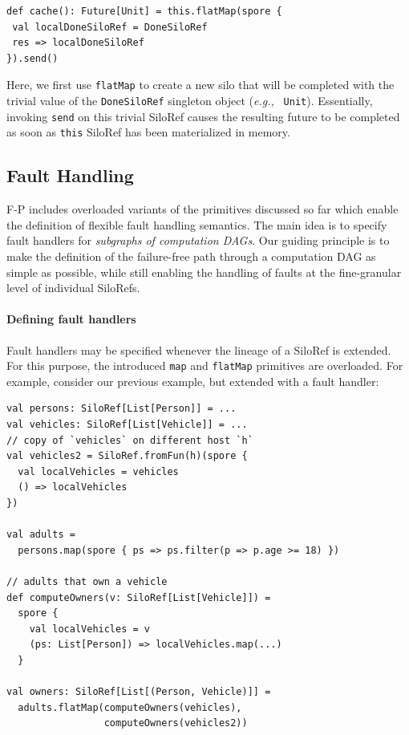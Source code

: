 \documentclass[preprint]{sigplanconf}
\theoremstyle{definition}
\theoremstyle{definition}
\newcommand{\eg}{{\em e.g.,~}}
\begin{document}
\begin{lstlisting}
def cache(): Future[Unit] = this.flatMap(spore {
 val localDoneSiloRef = DoneSiloRef
 res => localDoneSiloRef
}).send()

\end{lstlisting}
\noindent
Here, we first use \verb|flatMap| to create a new silo that will be completed
with the trivial value of the \verb|DoneSiloRef| singleton object (\eg
\verb|Unit|). Essentially, invoking \verb|send| on this trivial SiloRef causes
the resulting future to be completed as soon as \verb|this| SiloRef has been
materialized in memory.






\subsection{Fault Handling}
\label{sec:fault-handling}

F-P includes overloaded variants of the primitives discussed so far which
enable the definition of flexible fault handling semantics. The main idea is
to specify fault handlers for \emph{subgraphs of computation DAGs}. Our
guiding principle is to make the definition of the failure-free path through a
computation DAG as simple as possible, while still enabling the handling of
faults at the fine-granular level of individual SiloRefs.

\paragraph{Defining fault handlers} Fault handlers may be specified whenever
the lineage of a SiloRef is extended. For this purpose, the introduced
\verb|map| and \verb|flatMap| primitives are overloaded. For example,
consider our previous example, but extended with a fault handler:

\begin{lstlisting}
val persons: SiloRef[List[Person]] = ...
val vehicles: SiloRef[List[Vehicle]] = ...
// copy of `vehicles` on different host `h`
val vehicles2 = SiloRef.fromFun(h)(spore {
  val localVehicles = vehicles
  () => localVehicles
})

val adults =
  persons.map(spore { ps => ps.filter(p => p.age >= 18) })

// adults that own a vehicle
def computeOwners(v: SiloRef[List[Vehicle]]) =
  spore {
    val localVehicles = v
    (ps: List[Person]) => localVehicles.map(...)
  }

val owners: SiloRef[List[(Person, Vehicle)]] =
  adults.flatMap(computeOwners(vehicles),
                 computeOwners(vehicles2))
\end{lstlisting}
\end{document}
